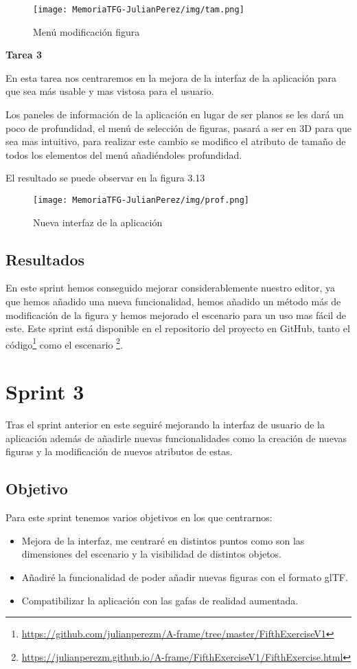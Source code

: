 \documentclass[a4paper, 12pt]{book}
\begin{document}
\begin{figure}[H]
  \centering
  \texttt{[image: MemoriaTFG-JulianPerez/img/tam.png]}
  \caption{Menú modificación figura}\label{scrum}
\end{figure}

\textbf{Tarea 3}

En esta tarea nos centraremos en la mejora de la interfaz de la aplicación para que sea más usable y mas vistosa para el usuario. 

Los paneles de información de la aplicación en lugar de ser planos se les dará un poco de profundidad, el menú de selección de figuras, pasará a ser en 3D para que sea mas intuitivo, para realizar este cambio se modifico el atributo de tamaño de todos los elementos del menú añadiéndoles profundidad.

El resultado se puede observar en la figura 3.13

\begin{figure}[H]
  \centering
  \texttt{[image: MemoriaTFG-JulianPerez/img/prof.png]}
  \caption{Nueva interfaz de la aplicación}\label{scrum}
\end{figure}

\subsection{Resultados}

En este sprint hemos conseguido mejorar considerablemente nuestro editor, ya que hemos añadido una nueva funcionalidad, hemos añadido un método más de modificación de la figura y hemos mejorado el escenario para un uso mas fácil de este. Este sprint está disponible en el repositorio del proyecto en GitHub, tanto el código\footnote{\url{https://github.com/julianperezm/A-frame/tree/master/FifthExerciseV1}} como el escenario \footnote{\url{https://julianperezm.github.io/A-frame/FifthExerciseV1/FifthExercise.html}}.


\section{Sprint 3}

Tras el sprint anterior en este seguiré mejorando la interfaz de usuario de la aplicación además de añadirle nuevas funcionalidades como la creación de nuevas figuras y la modificación de nuevos atributos de estas.

\subsection{Objetivo}
Para este sprint tenemos varios objetivos en los que centrarnos:
\begin{itemize}
    \item Mejora de la interfaz, me centraré en distintos puntos como son las dimensiones del escenario y la visibilidad de distintos objetos.
    \item Añadiré la funcionalidad de poder añadir nuevas figuras con el formato glTF.
    \item Compatibilizar la aplicación con las gafas de realidad aumentada.
\end{itemize}
\end{document}
